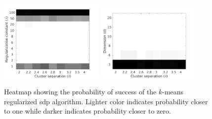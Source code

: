 \documentclass[12pt]{article}
\begin{document}
\begin{figure}[t]
  \centering
  \includegraphics[width=0.45\textwidth]{figures/optimizationClustering/deltaLambda.png}
  \includegraphics[width=0.45\textwidth]{figures/optimizationClustering/deltaD.png}
  \caption{Heatmap showing the probability of success of the $k$-means regularized sdp algorithm. Lighter color indicates probability closer to one while darker indicates probability closer to zero.}
  \label{a-figure:simulationSepL}
\end{figure}
\end{document}
